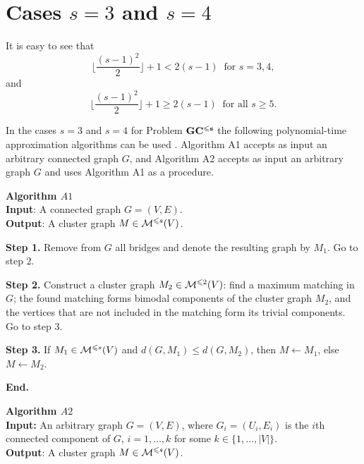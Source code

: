 \documentclass[runningheads]{llncs}
\begin{document}
\section{Cases $s=3$ and $s=4$}

It is easy to see that 
$$
  \Bigg\lfloor\frac{(s-1)^2}{2}\Bigg\rfloor + 1 < 2(s-1) 
  \ \mbox{ for } s=3, 4,
$$ 
and 
$$ 
  \Bigg\lfloor\frac{(s-1)^2}{2}\Bigg\rfloor + 1 \geqslant 2(s-1) 
  \ \mbox{ for all } s \geqslant 5.
$$

In the cases $s=3$ and $s=4$ for Problem ${\bf GC^{\leqslant s}}$
the following polynomial-time approximation algorithms can be used 
\cite{iin16}.  
Algorithm A1 accepts as input an arbitrary connected graph $G$,
and Algorithm A2 accepts as input an arbitrary graph $G$
and uses Algorithm A1 as a procedure.

\medskip

{\bf Algorithm $A1$}
\\
\textbf{Input}: A connected graph $G = (V,E)$.
\\
\textbf{Output}: A cluster graph $M  \in {\cal M}^{\leqslant s}(V)$.

\textbf{Step 1.} Remove from $G$ all bridges and denote the resulting graph 
by $M_1$. Go to step 2.

\textbf{Step 2.} Construct a cluster graph $M_2\in {\cal M}^{\leqslant 2}(V)$: 
find a maximum matching in $G$; the found
matching forms bimodal components of the cluster graph $M_2$, 
and the vertices that are not included
in the matching form its trivial components. Go to step 3.

\textbf{Step 3.} If $M_1 \in {\cal M}^{\leqslant s}(V)$ and 
$d(G,M_1)\leqslant d(G,M_2)$, then 
$M \leftarrow M_1$, else $M \leftarrow M_2$.

\textbf{End.}

\medskip


{\bf Algorithm $A2$}
\\
\textbf{Input:} An arbitrary graph $G = (V,E)$, where $G_i = (U_i,E_i)$ 
is the $i$th connected component of $G$,
$i = 1, \dots , k$ for some $k \in \{1, \dots , |V |\}$.
\\
\textbf{Output}: A cluster graph $M  \in {\cal M}^{\leqslant s}(V)$.
\end{document}
